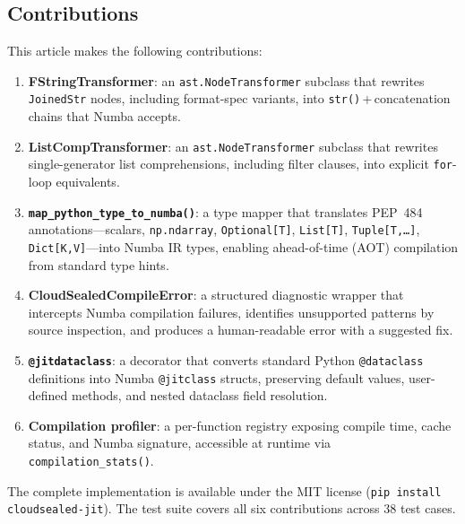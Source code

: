 \documentclass[journal]{IEEEtran}
\begin{document}
\subsection*{Contributions}

This article makes the following contributions:

\begin{enumerate}
  \item \textbf{FStringTransformer}: an \texttt{ast.NodeTransformer} subclass
    that rewrites \texttt{JoinedStr} nodes, including format-spec variants,
    into \texttt{str()}\,+\,concatenation chains that Numba accepts.

  \item \textbf{ListCompTransformer}: an \texttt{ast.NodeTransformer} subclass
    that rewrites single-generator list comprehensions, including filter
    clauses, into explicit \texttt{for}-loop equivalents.

  \item \textbf{\texttt{map\_python\_type\_to\_numba()}}: a type mapper that
    translates PEP~484 annotations—scalars, \texttt{np.ndarray},
    \texttt{Optional[T]}, \texttt{List[T]}, \texttt{Tuple[T,\ldots]},
    \texttt{Dict[K,V]}—into Numba IR types, enabling ahead-of-time (AOT)
    compilation from standard type hints.

  \item \textbf{CloudSealedCompileError}: a structured diagnostic wrapper that
    intercepts Numba compilation failures, identifies unsupported patterns
    by source inspection, and produces a human-readable error with a suggested
    fix.

  \item \textbf{\texttt{@jitdataclass}}: a decorator that converts standard
    Python \texttt{@dataclass} definitions into Numba \texttt{@jitclass}
    structs, preserving default values, user-defined methods, and nested
    dataclass field resolution.

  \item \textbf{Compilation profiler}: a per-function registry exposing compile
    time, cache status, and Numba signature, accessible at runtime via
    \texttt{compilation\_stats()}.
\end{enumerate}

The complete implementation is available under the MIT license
(\texttt{pip install cloudsealed-jit}). The test suite covers all six
contributions across 38 test cases.

\end{document}
